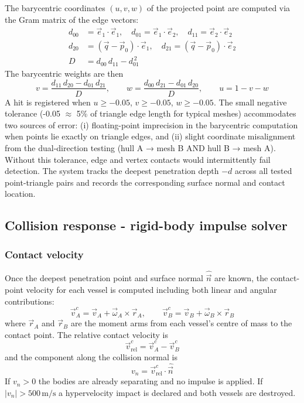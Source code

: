 \documentclass[Orbiter Technical Reference.tex]{subfiles}
\begin{document}
The barycentric coordinates $(u, v, w)$ of the projected point are computed
via the Gram matrix of the edge vectors:
\begin{equation}
\begin{aligned}
d_{00} &= \vec{e}_1 \cdot \vec{e}_1, \quad
d_{01} = \vec{e}_1 \cdot \vec{e}_2, \quad
d_{11} = \vec{e}_2 \cdot \vec{e}_2 \\[4pt]
d_{20} &= (\vec{q} - \vec{p}_0) \cdot \vec{e}_1, \quad
d_{21} = (\vec{q} - \vec{p}_0) \cdot \vec{e}_2 \\[4pt]
D &= d_{00}\,d_{11} - d_{01}^{\,2}
\end{aligned}
\label{eq:gram}
\end{equation}
The barycentric weights are then
\begin{equation}
v = \frac{d_{11}\,d_{20} - d_{01}\,d_{21}}{D}, \qquad
w = \frac{d_{00}\,d_{21} - d_{01}\,d_{20}}{D}, \qquad
u = 1 - v - w
\label{eq:bary}
\end{equation}
A hit is registered when $u \ge -0.05$, $v \ge -0.05$, $w \ge -0.05$.
The small negative tolerance (-0.05 $\approx$ 5\% of triangle edge length for
typical meshes) accommodates two sources of error: (i) floating-point
imprecision in the barycentric computation when points lie exactly on
triangle edges, and (ii) slight coordinate misalignment from the
dual-direction testing (hull A → mesh B AND hull B → mesh A).
Without this tolerance, edge and vertex contacts would intermittently fail
detection.
The system tracks the deepest penetration depth $-d$ across all tested
point-triangle pairs and records the corresponding surface normal and
contact location.


\subsection{Collision response - rigid-body impulse solver}
\label{ssec:response}

\subsubsection{Contact velocity}
Once the deepest penetration point and surface normal $\hat{\vec{n}}$
are known, the contact-point velocity for each vessel is computed
including both linear and angular contributions:
\begin{equation}
\vec{v}_A^c = \vec{v}_A + \vec{\omega}_A \times \vec{r}_A, \qquad
\vec{v}_B^c = \vec{v}_B + \vec{\omega}_B \times \vec{r}_B
\label{eq:contact_vel}
\end{equation}
where $\vec{r}_A$ and $\vec{r}_B$ are the moment arms from each vessel's
centre of mass to the contact point.
The relative contact velocity is
\begin{equation*}
\vec{v}_{\mathrm{rel}}^c = \vec{v}_A^c - \vec{v}_B^c
\end{equation*}
and the component along the collision normal is
\begin{equation*}
v_n = \vec{v}_{\mathrm{rel}}^c \cdot \hat{\vec{n}}
\end{equation*}
If $v_n > 0$ the bodies are already separating and no impulse is applied.
If $|v_n| > 500\,\text{m/s}$ a hypervelocity impact is declared and
both vessels are destroyed.
\end{document}
